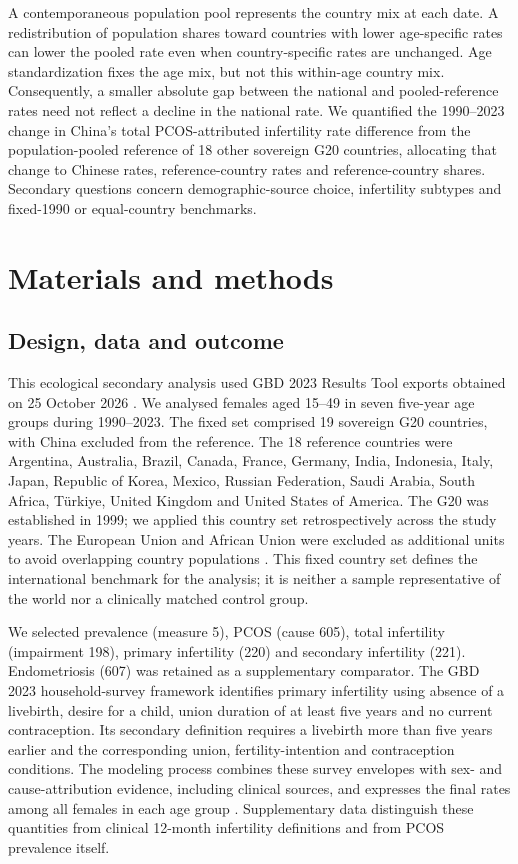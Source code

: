 \documentclass[11pt,a4paper]{article}
\begin{document}
{\color{blue} A contemporaneous population pool represents the country mix at each date. A redistribution of population shares toward countries with lower age-specific rates can lower the pooled rate even when country-specific rates are unchanged. Age standardization fixes the age mix, but not this within-age country mix. Consequently, a smaller absolute gap between the national and pooled-reference rates need not reflect a decline in the national rate. We quantified the 1990--2023 change in China's total PCOS-attributed infertility rate difference from the population-pooled reference of 18 other sovereign G20 countries, allocating that change to Chinese rates, reference-country rates and reference-country shares. Secondary questions concern demographic-source choice, infertility subtypes and fixed-1990 or equal-country benchmarks.}

\section{Materials and methods}
\subsection{Design, data and outcome}
This ecological secondary analysis used GBD 2023 Results Tool exports obtained on 25 October 2026 \citep{results}. We analysed females aged 15--49 in seven five-year age groups during 1990--2023. The fixed set comprised 19 sovereign G20 countries, with China excluded from the reference. The 18 reference countries were Argentina, Australia, Brazil, Canada, France, Germany, India, Indonesia, Italy, Japan, Republic of Korea, Mexico, Russian Federation, Saudi Arabia, South Africa, Türkiye, United Kingdom and United States of America. The G20 was established in 1999; we applied this country set retrospectively across the study years. The European Union and African Union were excluded as additional units to avoid overlapping country populations \citep{g20}. This fixed country set defines the international benchmark for the analysis; it is neither a sample representative of the world nor a clinically matched control group.

We selected prevalence (measure 5), PCOS (cause 605), total infertility (impairment 198), primary infertility (220) and secondary infertility (221). Endometriosis (607) was retained as a supplementary comparator. The GBD 2023 household-survey framework identifies primary infertility using absence of a livebirth, desire for a child, union duration of at least five years and no current contraception. Its secondary definition requires a livebirth more than five years earlier and the corresponding union, fertility-intention and contraception conditions. The modeling process combines these survey envelopes with sex- and cause-attribution evidence, including clinical sources, and expresses the final rates among all females in each age group \citep{gbd}. Supplementary data distinguish these quantities from clinical 12-month infertility definitions and from PCOS prevalence itself.
\end{document}
